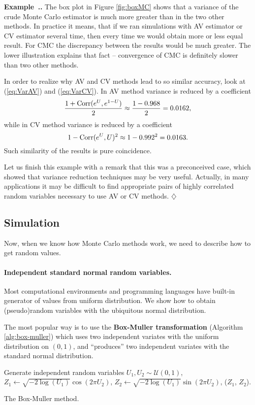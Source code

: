 \documentclass[a4paper,11pt, twoside]{book}
\theoremstyle{definition}
\theoremstyle{remark}
\newcounter{example}[chapter]
\newenvironment{example}
   {\refstepcounter{example} \par\medskip\noindent \textbf{Example~\arabic{chapter}.\arabic{example}.}  }
   {\hfill $\diamondsuit$\par\noindent\ignorespacesafterend}
\def\Corr{{\hbox{Corr}}}
\begin{document}
\begin{example}
The box plot in Figure \ref{fig:boxMC} shows that a variance of the crude Monte Carlo estimator is much more greater than in the two other methods. In practice it means, that if we ran simulations with AV estimator or CV estimator several time, then every time we would obtain more or less equal result. For CMC the discrepancy between the results would be much greater.
The lower illustration explains that fact -- convergence of CMC is definitely slower than two other methods.

In order to realize why AV and CV methods lead to so similar accuracy, look at (\ref{eq:VarAV}) and (\ref{eq:VarCV}). In AV method variance is reduced by a coefficient
\[ \frac{1 + \Corr(e^U, e^{1-U})}{2} \approx \frac{1 - 0.968}{2} = 0.0162, \]
while in CV method variance is reduced by a coefficient
\[ 1 - \Corr(e^U, U)^2 \approx 1 - 0.992^2 = 0.0163. \]
Such similarity of the results is pure coincidence.

Let us finish this example with a remark that this was a preconceived case, which showed that variance reduction techniques may be very useful. Actually, in many applications it may be difficult to find appropriate pairs of highly correlated random variables necessary to use AV or CV methods.
\end{example}


\subsection{Simulation}
\label{subsec:simulation}
Now, when we know how Monte Carlo methods work, we need to describe how to get random values.
\paragraph{Independent standard normal random variables.} Most computational environments and programming languages have built-in generator of values from uniform distribution. We show how to obtain (pseudo)random variables with the ubiquitous normal distribution.

The most popular way is to use the \textbf{Box-Muller transformation} (Algorithm \ref{alg:box-muller}) which uses two independent variates with the uniform distribution on $(0,1)$, and ``produces'' two independent variates with the standard normal distribution.
\begin{algorithm}
 \begin{algorithmic}[1]
    \State Generate independent random variables $U_1, U_2 \sim \mathcal{U}(0,1)$,
    \State $Z_1 \gets \sqrt{-2\log(U_1)} \cos(2\pi U_2)$,
    \State $Z_2 \gets \sqrt{-2\log(U_1)} \sin(2\pi U_2)$,
    \State \Return ($Z_1$, $Z_2$).
  \EndFunction
 \end{algorithmic}
 \caption{The Box-Muller method.}
 \label{alg:box-muller}
\end{algorithm}
\end{document}
